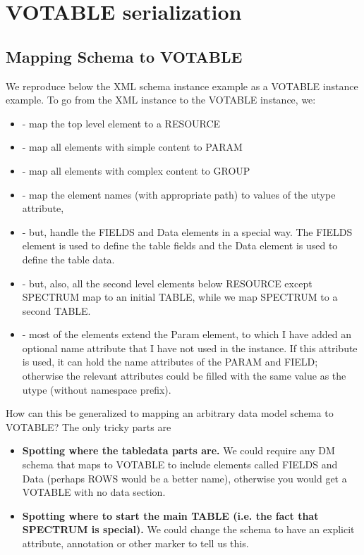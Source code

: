 
\section{VOTABLE serialization}

\subsection{Mapping Schema to VOTABLE}

We reproduce below the XML schema instance example as a VOTABLE instance example.
To go from the XML instance to the VOTABLE
instance, we:
\begin{itemize}
\item  - map the top level element to a RESOURCE
\item  - map all elements with simple content to PARAM
\item  - map all elements with complex content to GROUP
\item  - map the element names (with appropriate path) to values of the
utype attribute,
\item  - but, handle the FIELDS and Data elements in a special way.
The FIELDS element is used to define the table fields and the Data
element is used to define the table data. 
\item  - but, also,  all the second level elements below RESOURCE
except SPECTRUM map to an initial TABLE, while we map SPECTRUM 
to a second TABLE.
\item  - most of the elements extend the Param element, to which I have added
an optional name attribute that I have not used in the instance.
If this attribute is used, it can hold the name attributes of the PARAM and
FIELD; otherwise the relevant attributes could be filled with the
same value as the utype (without namespace prefix).

\end{itemize}

How can this be generalized to mapping an arbitrary data model
schema to VOTABLE? The only tricky parts are 
\begin{itemize}
\item  {\bf Spotting where the tabledata parts are. } 
We could require any DM schema that maps to VOTABLE
to include elements called FIELDS and Data (perhaps ROWS would be 
a better name), otherwise you would get a VOTABLE with no data section.
\item  {\bf Spotting where to start the main TABLE (i.e. the fact that
SPECTRUM is special). }  We could change the schema to
have an explicit attribute, annotation or other marker to tell us this.
\end{itemize}

